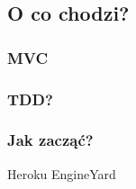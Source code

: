 \subsection{O co chodzi?}
\begin{frame}[fragile]
\frametitle{MVC}
\end{frame}

\begin{frame}[fragile]
\frametitle{TDD?}
\end{frame}

\begin{frame}[fragile]
\frametitle{Jak zacząć?}

Heroku 
EngineYard
\end{frame}

